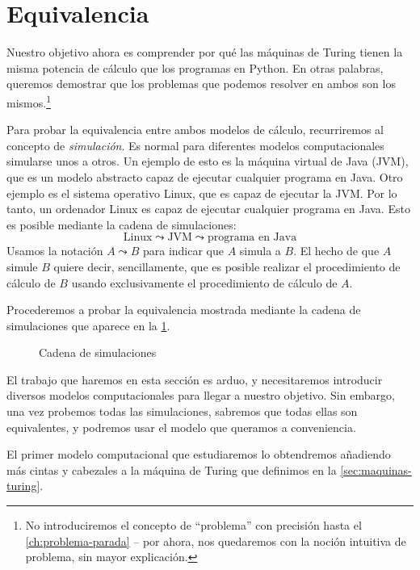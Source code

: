 \section{Equivalencia}\label{sec:equivalencia}

Nuestro objetivo ahora es comprender por qué las máquinas de Turing tienen la misma potencia de cálculo que los programas en Python. En otras palabras, queremos demostrar que los problemas que podemos resolver en ambos son los mismos.\footnote{No introduciremos el concepto de ``problema'' con precisión hasta el \cref{ch:problema-parada} -- por ahora, nos quedaremos con la noción intuitiva de problema, sin mayor explicación.}

Para probar la equivalencia entre ambos modelos de cálculo, recurriremos al concepto de \emph{simulación}. Es normal para diferentes modelos computacionales simularse unos a otros. Un ejemplo de esto es la máquina virtual de Java (JVM), que es un modelo abstracto capaz de ejecutar cualquier programa en Java. \cite{Evans2018} Otro ejemplo es el sistema operativo Linux, que es capaz de ejecutar la JVM. Por lo tanto, un ordenador Linux es capaz de ejecutar cualquier programa en Java. Esto es posible mediante la cadena de simulaciones:
$$
    \text{Linux} \leadsto \text{JVM} \leadsto \text{programa en Java}
$$
Usamos la notación $A \leadsto B$ para indicar que $A$ simula a $B$. El hecho de que $A$ simule $B$ quiere decir, sencillamente, que es posible realizar el procedimiento de cálculo de $B$ usando exclusivamente el procedimiento de cálculo de $A$.

Procederemos a probar la equivalencia mostrada mediante la cadena de simulaciones que aparece en la \cref{fig:cadena-simulaciones}.

\begin{figure}[H]
\centering
\vspace*{8pt}

\caption{Cadena de simulaciones}
\label{fig:cadena-simulaciones}
\end{figure}

El trabajo que haremos en esta sección es arduo, y necesitaremos introducir diversos modelos computacionales para llegar a nuestro objetivo. Sin embargo, una vez probemos todas las simulaciones, sabremos que todas ellas son equivalentes, y podremos usar el modelo que queramos a conveniencia.

El primer modelo computacional que estudiaremos lo obtendremos añadiendo más cintas y cabezales a la máquina de Turing que definimos en la \cref{sec:maquinas-turing}. \cite{Sipser2012}

